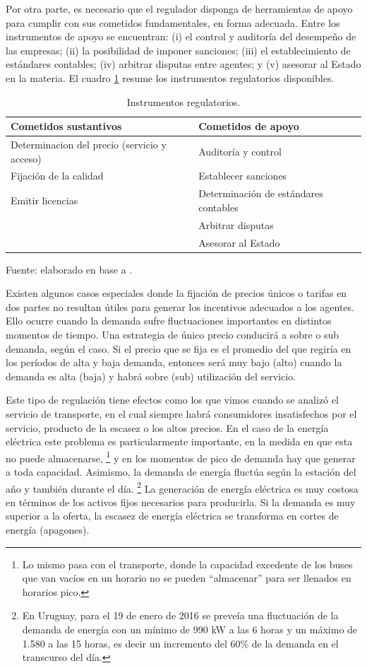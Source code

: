 \documentclass[
  12pt,
  spanish,
]{book}
\begin{document}
Por otra parte, es necesario que el regulador disponga de herramientas de apoyo para cumplir con sus cometidos fundamentales, en forma adecuada. Entre los instrumentos de apoyo se encuentran: (i) el control y auditoría del desempeño de las empresas; (ii) la posibilidad de imponer sanciones; (iii) el establecimiento de estándares contables; (iv) arbitrar disputas entre agentes; y (v) asesorar al Estado en la materia. El cuadro \ref{tab:cuadro2} resume los instrumentos regulatorios disponibles.

\begin{table}

\caption{\label{tab:cuadro2}Instrumentos regulatorios.}
\centering
\begin{tabular}[t]{l|l}
\hline
Cometidos sustantivos & Cometidos de apoyo\\
\hline
Determinacion del precio (servicio y acceso) & Auditoría y control\\
\hline
Fijación de la calidad & Establecer sanciones\\
\hline
Emitir licencias & Determinación de estándares contables\\
\hline
 & Arbitrar disputas\\
\hline
 & Asesorar al Estado\\
\hline
\end{tabular}
\end{table}

Fuente: elaborado en base a \citet{Berg2013}.

Existen algunos casos especiales donde la fijación de precios únicos o tarifas en dos partes no resultan útiles para generar los incentivos adecuados a los agentes. Ello ocurre cuando la demanda sufre fluctuaciones importantes en distintos momentos de tiempo. Una estrategia de único precio conducirá a sobre o sub demanda, según el caso. Si el precio que se fija es el promedio del que regiría en los períodos de alta y baja demanda, entonces será muy bajo (alto) cuando la demanda es alta (baja) y habrá sobre (sub) utilización del servicio.

Este tipo de regulación tiene efectos como los que vimos cuando se analizó el servicio de transporte, en el cual siempre habrá consumidores insatisfechos por el servicio, producto de la escasez o los altos precios. En el caso de la energía eléctrica este problema es particularmente importante, en la medida en que esta no puede almacenarse,
\footnote{Lo mismo pasa con el transporte, donde la capacidad excedente de los buses que van vacíos en un horario no se pueden ``almacenar'' para ser llenados en horarios pico.}
y en los momentos de pico de demanda hay que generar a toda capacidad. Asimismo, la demanda de energía fluctúa según la estación del año y también durante el día.
\footnote{En Uruguay, para el 19 de enero de 2016 se preveía una fluctuación de la demanda de energía con un mínimo de 990 kW a las 6 horas y un máximo de 1.580 a las 15 horas, es decir un incremento del 60\% de la demanda en el transcurso del día.}
La generación de energía eléctrica es muy costosa en términos de los activos fijos necesarios para producirla. Si la demanda es muy superior a la oferta, la escasez de energía eléctrica se transforma en cortes de energía (apagones).
\end{document}
